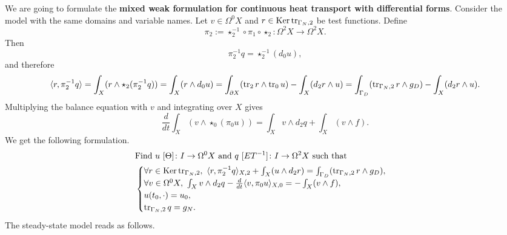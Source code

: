 \begin{discussion}
  We are going to formulate the \textbf{mixed weak formulation for continuous
  heat transport with differential forms}.
  Consider the model
  with the same domains and variable names.
  Let $v \in \Omega^0 X$ and $r \in \mathop{\rm Ker}\nolimits \mathop{\rm tr}\nolimits_{\Gamma_N, 2}$ be test functions.
  Define
  \begin{equation}
    \pi_2 :=
    \star_2^{-1} \circ \pi_1 \circ \star_2 \colon \Omega^2 X \to \Omega^2 X.
  \end{equation}
  Then
  \begin{equation}
    \pi_2^{-1} q = \star_2^{-1} (d_0 u),
  \end{equation}
  and therefore
  \begin{equation}
    \langle r,\pi_2^{-1} q\rangle
    = \int_X (r \wedge \star_2 (\pi_2^{-1} q))
    = \int_X (r \wedge d_0 u)
    = \int_{\partial X} (\mathop{\rm tr}\nolimits_2 r \wedge \mathop{\rm tr}\nolimits_0 u) - \int_{X} (d_2 r \wedge u)
    = \int_{\Gamma_D} (\mathop{\rm tr}\nolimits_{\Gamma_N, 2} r \wedge g_D)
    - \int_{X} (d_2 r \wedge u).
  \end{equation}
  Multiplying the balance equation with $v$ and integrating over $X$ gives
  \begin{equation}
    \frac{d}{d t} \int_X (v \wedge \star_0 (\pi_0 u))
    = \int_X v \wedge d_2 q + \int_X (v \wedge f).
  \end{equation}
  We get the following formulation.
  \begin{equation}
    \begin{split}
      & \text{Find $u\ [\Theta] \colon I \to \Omega^0 X$ and
        $q\ [E T^{-1}] \colon I \to \Omega^2 X$ such that} \\
      &
      \begin{cases}
        \forall r \in \mathop{\rm Ker}\nolimits \mathop{\rm tr}\nolimits_{\Gamma_N, 2},\
          \langle r,\pi_2^{-1} q\rangle_{X, 2} + \int_{X} (u \wedge d_2 r)
          = \int_{\Gamma_D} (\mathop{\rm tr}\nolimits_{\Gamma_N, 2} r \wedge g_D), \\
        \forall v \in \Omega^0 X,\
          \int_X v \wedge d_2 q
          - \frac{d}{d t} \langle v,\pi_0 u\rangle_{X, 0}
          = - \int_X (v \wedge f), \\
        u(t_0, \cdot) = u_0, \\
        \mathop{\rm tr}\nolimits_{\Gamma_N, 2} q = g_N.
      \end{cases}
    \end{split}
  \end{equation}
  The steady-state model reads as follows.

\end{discussion}
